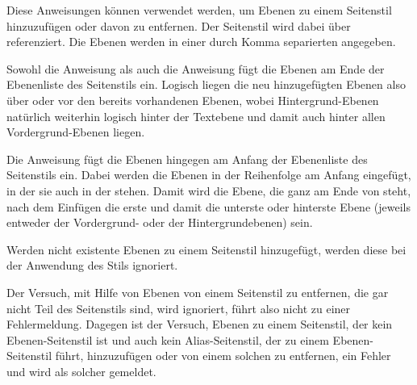 \begin{Declaration}
\end{Declaration}
%
%
Diese Anweisungen können verwendet werden, um Ebenen zu einem Seitenstil
hinzuzufügen oder davon zu entfernen. Der Seitenstil wird dabei über
 referenziert. Die Ebenen werden in einer durch Komma
separierten  angegeben. 

Sowohl die Anweisung  als auch die Anweisung
 fügt die Ebenen
am Ende der Ebenenliste des Seitenstils ein. Logisch liegen die neu
hinzugefügten Ebenen also über oder vor den bereits vorhandenen Ebenen, wobei
Hintergrund-Ebenen natürlich weiterhin logisch hinter der Textebene und damit
auch hinter allen Vordergrund-Ebenen liegen.

Die Anweisung  fügt die Ebenen hingegen am Anfang der Ebenenliste des Seitenstils
ein. Dabei werden die Ebenen in der Reihenfolge am Anfang eingefügt, in der
sie auch in der  stehen. Damit wird die Ebene, die ganz am
Ende von  steht, nach dem Einfügen die erste und damit die
unterste oder hinterste Ebene (jeweils entweder der Vordergrund- oder der
Hintergrundebenen) sein.

Werden nicht existente Ebenen zu einem Seitenstil
hinzugefügt, werden diese bei der Anwendung des Stils ignoriert.

\iffalse%
Die Anweisung \Macro{RemoveLayersFromPageStyle} dient dem genauen
Gegenteil. Sie entfernt\textnote{entfernen} die angegebenen Ebenen von
Seitenstil.%
\fi

Der Versuch, mit Hilfe von
 Ebenen von einem
Seitenstil zu entfernen, die gar nicht Teil des Seitenstils sind, wird
ignoriert, führt also nicht zu einer Fehlermeldung. Dagegen ist der Versuch,
Ebenen zu einem Seitenstil, der kein Ebenen-Seitenstil ist und auch kein
Alias-Seitenstil, der zu einem Ebenen-Seitenstil führt, hinzuzufügen oder von
einem solchen zu entfernen, ein Fehler und wird als solcher gemeldet.%
\EndIndexGroup



